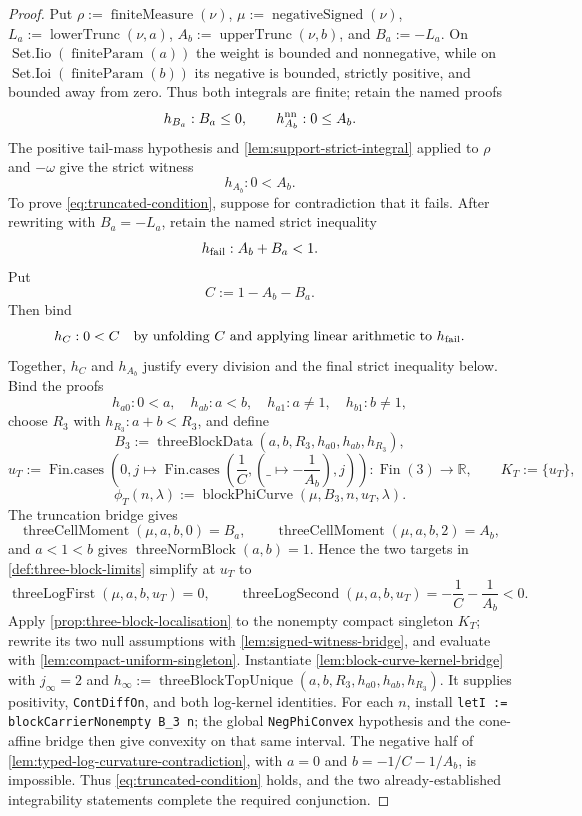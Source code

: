 \documentclass[9pt]{extarticle}
\theoremstyle{definition}
\theoremstyle{remark}
\newcommand{\R}{\mathbb R}
\begin{document}
\begin{proof}
Put $\rho:=\operatorname{finiteMeasure}(\nu)$,
$\mu:=\operatorname{negativeSigned}(\nu)$,
$L_a:=\operatorname{lowerTrunc}(\nu,a)$,
$A_b:=\operatorname{upperTrunc}(\nu,b)$, and $B_a:=-L_a$.
On $\operatorname{Set.Iio}(\operatorname{finiteParam}(a))$ the weight is
bounded and nonnegative, while on
$\operatorname{Set.Ioi}(\operatorname{finiteParam}(b))$ its negative is
bounded, strictly positive, and bounded away from zero.  Thus both integrals
are finite; retain the named proofs
\[
 h_{B_a}:B_a\leq0,\qquad h_{A_b}^{\rm nn}:0\leq A_b.
\]
The positive tail-mass hypothesis and
\cref{lem:support-strict-integral} applied to $\rho$ and $-\omega$ give the
strict witness
\[
 h_{A_b}:0<A_b.
\]
To prove \cref{eq:truncated-condition}, suppose for contradiction that it
fails.  After rewriting with $B_a=-L_a$, retain the named strict inequality
\[
 h_{\rm fail}:A_b+B_a<1.
\]
Put
\[
 C:=1-A_b-B_a.
\]
Then bind
\[
 h_C:0<C
 \quad\text{by unfolding \(C\) and applying linear arithmetic to
 \(h_{\rm fail}\)}.
\]
Together, $h_C$ and $h_{A_b}$ justify every division and the final strict
inequality below.  Bind the proofs
\[
 h_{a0}:0<a,\quad h_{ab}:a<b,\quad
 h_{a1}:a\neq1,\quad h_{b1}:b\neq1,
\]
choose $R_3$ with $h_{R_3}:a+b<R_3$, and define
\[
 B_3:=\operatorname{threeBlockData}
  (a,b,R_3,h_{a0},h_{ab},h_{R_3}),
\]
\[
 u_T:=\operatorname{Fin.cases}\!\left(
  0,j\mapsto\operatorname{Fin.cases}
   \left(\frac1C,(\_\mapsto-\frac1{A_b}),j\right)\right):
  \operatorname{Fin}(3)\to\R,\qquad K_T:=\{u_T\},
\]
\[
 \phi_T(n,\lambda):=
  \operatorname{blockPhiCurve}(\mu,B_3,n,u_T,\lambda).
\]
The truncation bridge gives
\[
 \operatorname{threeCellMoment}(\mu,a,b,0)=B_a,\qquad
 \operatorname{threeCellMoment}(\mu,a,b,2)=A_b,
\]
and $a<1<b$ gives
$\operatorname{threeNormBlock}(a,b)=1$.  Hence the two targets in
\cref{def:three-block-limits} simplify at $u_T$ to
\[
 \operatorname{threeLogFirst}(\mu,a,b,u_T)=0,\qquad
 \operatorname{threeLogSecond}(\mu,a,b,u_T)
 =-\frac1C-\frac1{A_b}<0.
\]
Apply \cref{prop:three-block-localisation} to the nonempty compact singleton
$K_T$; rewrite its two null assumptions with
\cref{lem:signed-witness-bridge}, and evaluate with
\cref{lem:compact-uniform-singleton}.  Instantiate
\cref{lem:block-curve-kernel-bridge} with $j_\infty=2$ and
$h_\infty:=\operatorname{threeBlockTopUnique}
 (a,b,R_3,h_{a0},h_{ab},h_{R_3})$.
It supplies positivity, \texttt{ContDiffOn}, and both log-kernel identities.
For each $n$, install
\texttt{letI := blockCarrierNonempty B\_3 n}; the global
\texttt{NegPhiConvex} hypothesis and the cone-affine bridge then give
convexity on that same interval.  The negative half of
\cref{lem:typed-log-curvature-contradiction}, with $a=0$ and
$b=-1/C-1/A_b$, is impossible.  Thus
\cref{eq:truncated-condition} holds, and the two already-established
integrability statements complete the required conjunction.
\end{proof}
\end{document}
